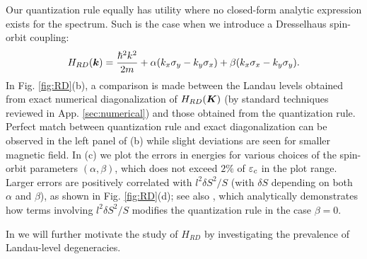 \documentclass[aps, prb, showpacs, twocolumn, notitlepage, superscriptaddress]{revtex4-1}
\begin{document}
Our quantization rule equally has utility where no closed-form analytic expression exists for the spectrum. Such is the case when we introduce a Dresselhaus spin-orbit coupling:
\begin{equation}
 H_{RD}(\bk)=\frac{{\hbar^2}k^2}{2m}+\alpha(k_{x}\sigma_{y}-k_{y}\sigma_{x})+\beta(k_{x}\sigma_{x}-k_{y}\sigma_{y}).\la{hamRD}
\end{equation}
In Fig. \ref{fig:RD}(b), a comparison is made between the Landau levels obtained from exact numerical diagonalization of $H_{RD}(\boldsymbol{K})$ (by standard techniques reviewed in App. \ref{sec:numerical}) and those obtained from the quantization rule. Perfect match between quantization rule and exact diagonalization can be observed in the left panel of (b) while slight deviations are seen for smaller magnetic field. In (c) we plot the errors in energies for various choices of the spin-orbit parameters $(\alpha,\beta)$, which does not exceed $2\%$ of $\varepsilon_c$ in the plot range. Larger errors are positively correlated with 
$l^2\delta S^2/S$ (with $\delta S$ depending on both $\alpha$ and $\beta$), as shown in Fig. \ref{fig:RD}(d); see also , which analytically demonstrates how terms involving $l^2\delta S^2/S$ modifies the quantization rule in the case $\beta=0$. 

In  we will further motivate the study of $H_{RD}$ by investigating the prevalence of Landau-level degeneracies. 





\end{document}
